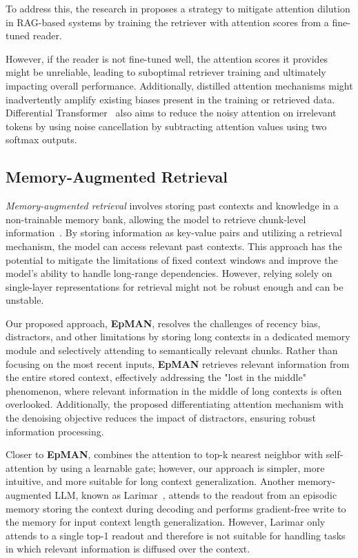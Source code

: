 To address this, the research in \cite{attention_distillation} proposes a strategy to mitigate attention dilution in RAG-based systems by training the retriever with attention scores from a fine-tuned reader. 

However, if the reader is not fine-tuned well, the attention scores it provides might be unreliable, leading to suboptimal retriever training and ultimately impacting overall performance. Additionally, distilled attention mechanisms might inadvertently amplify existing biases present in the training or retrieved data. Differential Transformer~\cite{ye2024differential} also aims to reduce the noisy attention on irrelevant tokens by using noise cancellation by subtracting attention values using two softmax outputs.


\subsection{Memory-Augmented Retrieval}
\textit{Memory-augmented retrieval} involves storing past contexts and knowledge in a non-trainable memory bank, allowing the model to retrieve chunk-level information~\cite{memlong, memllm, mem-tree}. By storing information as key-value pairs and utilizing a retrieval mechanism, the model can access relevant past contexts. This approach has the potential to mitigate the limitations of fixed context windows and improve the model's ability to handle long-range dependencies. However, relying solely on single-layer representations for retrieval might not be robust enough and can be unstable. 


Our proposed approach, \textbf{EpMAN}, resolves the challenges of recency bias, distractors, and other limitations by storing long contexts in a dedicated memory module and selectively attending to semantically relevant chunks. Rather than focusing on the most recent inputs, \textbf{EpMAN} retrieves relevant information from the entire stored context, effectively addressing the "lost in the middle" phenomenon, where relevant information in the middle of long contexts is often overlooked. Additionally, the proposed differentiating attention mechanism with the denoising objective reduces the impact of distractors, ensuring robust information processing.

Closer to \textbf{EpMAN}, \cite{wu2022memorizingtransformers} combines the attention to top-k nearest neighbor with self-attention by using a learnable gate; however, our approach is simpler, more intuitive, and more suitable for long context generalization. Another memory-augmented LLM, known as Larimar~\cite{das2024larimar}, attends to the readout from an episodic memory storing the context during decoding and 
performs gradient-free write to the memory for input context length generalization. However, Larimar only attends to a single top-1 readout and therefore is not suitable for handling tasks in which relevant information is diffused over the context.